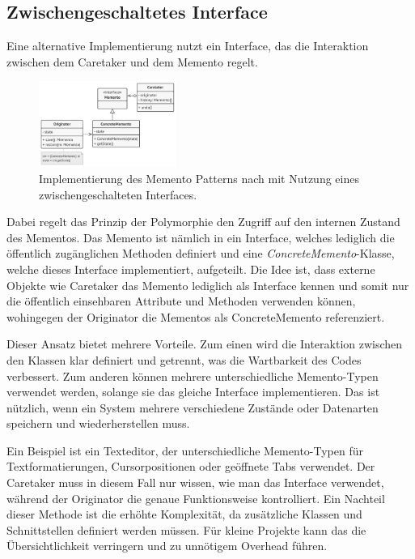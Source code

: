 \documentclass[9pt,conference]{IEEEtran}
\begin{document}
\subsection{Zwischengeschaltetes Interface}
Eine alternative Implementierung nutzt ein Interface, das die Interaktion zwischen dem Caretaker und dem Memento regelt.
\begin{figure}[htbp]
	\centerline{\includegraphics[width=0.4\textwidth]{figures/Intermediate-interface.png}}
	\caption{Implementierung des Memento Patterns nach \cite{refactoring-guru} mit Nutzung eines zwischengeschalteten Interfaces.}
	\label{fig:intermediate-interface}
\end{figure}
Dabei regelt das Prinzip der Polymorphie den Zugriff auf den internen Zustand des Mementos.
Das Memento ist nämlich in ein Interface, welches lediglich die öffentlich zugänglichen Methoden definiert und eine \emph{ConcreteMemento}-Klasse, welche dieses Interface implementiert, aufgeteilt.
Die Idee ist, dass externe Objekte wie Caretaker das Memento lediglich als Interface kennen und somit nur die öffentlich einsehbaren Attribute und Methoden verwenden können, wohingegen der Originator die Mementos als ConcreteMemento referenziert. 

Dieser Ansatz bietet mehrere Vorteile.
Zum einen wird die Interaktion zwischen den Klassen klar definiert und getrennt, was die Wartbarkeit des Codes verbessert.
Zum anderen können mehrere unterschiedliche Memento-Typen verwendet werden, solange sie das gleiche Interface implementieren.
Das ist nützlich, wenn ein System mehrere verschiedene Zustände oder Datenarten speichern und wiederherstellen muss.

Ein Beispiel ist ein Texteditor, der unterschiedliche Memento-Typen für Textformatierungen, Cursorpositionen oder geöffnete Tabs verwendet.
Der Caretaker muss in diesem Fall nur wissen, wie man das Interface verwendet, während der Originator die genaue Funktionsweise kontrolliert.
Ein Nachteil dieser Methode ist die erhöhte Komplexität, da zusätzliche Klassen und Schnittstellen definiert werden müssen.
Für kleine Projekte kann das die Übersichtlichkeit verringern und zu unnötigem Overhead führen.
\end{document}
